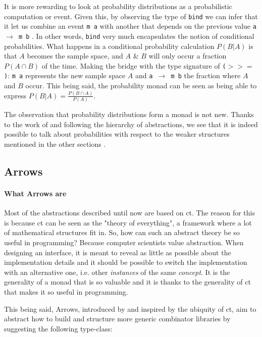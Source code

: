 \documentclass[
  oneside,
  11pt, a4paper,
  footinclude=true,
  headinclude=true,
  cleardoublepage=empty
]{scrbook}
\theoremstyle{definition}
\theoremstyle{definition}
\begin{document}
	It is more rewarding to look at probability distributions as a probabilistic computation or event. Given this, by observing the type of \texttt{bind} we can infer that it let us combine an event \texttt{m a} with another that depends on the previous value \texttt{a $\rightarrow$ m b} \citep{erwig_kollmansberger_2006}. In other words, \texttt{bind} very much encapsulates the notion of conditional probabilities. What happens in a conditional probability calculation $P(B|A)$ is that $A$ becomes the sample space, and $A$ \& $B$ will only occur a fraction $P(A \cap B)$ of the time. Making the bridge with the type signature of \texttt{($>>=$)}: \texttt{m a} represents the new sample space $A$ and \texttt{a $\rightarrow$ m b} the fraction where $A$ and $B$ occur. This being said, the probability monad can be seen as being able to express $P(B|A) = \frac{P(B \cap A)}{P(A)}$. 
	            
	The observation that probability distributions form a monad is not new. Thanks to the work of \cite{giry1982} and following the hierarchy of abstractions, we see that it is indeed possible to talk about probabilities with respect to the weaker structures mentioned in the other sections \citep{jtobin, Scibior19}.
	            
	    \subsection{Arrows}
	    
	        \paragraph{What Arrows are}
	        
    Most of the abstractions described until now are based on \gls{ct}. The reason for this is because \gls{ct} can be seen as the "theory of everything", a framework where a lot of mathematical structures fit in. So, how can such an abstract theory be so useful in programming? Because computer scientists value abstraction. When designing an interface, it is meant to reveal as little as possible about the implementation details and it should be possible to switch the implementation with an alternative one, i.e. other \emph{instances} of the same \emph{concept}. It is the generality of a monad that is so valuable and it is thanks to the generality of \gls{ct} that makes it so useful in programming.
    	        
    This being said, Arrows, introduced by \cite{Hughes:2000:GMA:347238.347246} and inspired by the ubiquity of \gls{ct}, aim to abstract how to build and structure more generic combinator libraries by suggesting the following type-class:
    	        
\end{document}
